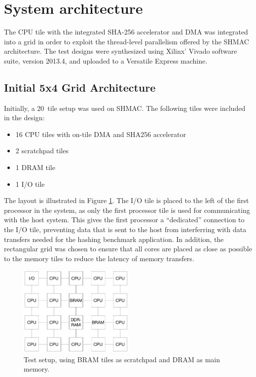 \section{System architecture}
\label{sec:SHMAC_sys_arch}

The CPU tile with the integrated SHA-256 accelerator and DMA was integrated into a grid in order
to exploit the thread-level parallelism offered by the SHMAC architecture.
The test designs were synthesized using Xilinx' Vivado software suite, version 2013.4, and
uploaded to a Versatile Express machine.

\subsection{Initial 5x4 Grid Architecture}
Initially, a 20~tile setup was used on SHMAC. The following tiles were included in the design:

\begin{itemize}
    \item 16 CPU tiles with on-tile DMA and SHA256 accelerator
    \item 2 scratchpad tiles
    \item 1 DRAM tile
    \item 1 I/O tile
\end{itemize}

The layout is illustrated in Figure \ref{fig:5x4}. The I/O tile is placed to the
left of the first processor in the system, as only the first processor tile is used
for communicating with the host system. This gives the first processor a ``dedicated''
connection to the I/O tile, preventing data that is sent to the host from interferring
with data transfers needed for the hashing benchmark application. In addition, the
rectangular grid was chosen to ensure that all cores are placed as close as possible
to the memory tiles to reduce the latency of memory transfers.

\begin{figure}[htb]
    \centering
    \includegraphics[width=0.5\textwidth]{Figures/Measurements/5x4}
    \caption{Test setup, using BRAM tiles as scratchpad and DRAM as main memory.}
    \label{fig:5x4}
\end{figure}

